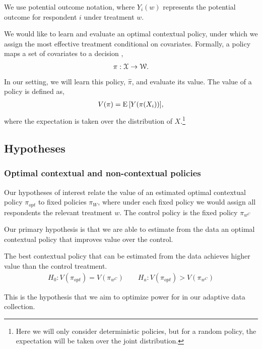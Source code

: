 \documentclass[letterpaper, 12pt, parskip=full,DIV=10]{scrartcl}
\begin{document}
We use potential outcome notation, where $Y_i(w)$ represents the potential outcome for respondent $i$ under treatment $w$.%


We would like to learn and evaluate an optimal contextual policy, under which we assign the most effective treatment conditional on covariates. Formally, a policy maps a set of covariates to a decision \citep{athey2017efficient}, %
\begin{align}
  \pi: {\EuScript X} \rightarrow {\EuScript W}. 
  \label{eq:policy}
\end{align}
In our setting, we will learn this policy, $\hat \pi$, and evaluate its value. The value of a policy is defined as, 
\begin{align}
V(\pi) =  {\textrm E}\,[Y(\pi(X_{i}))],
  \label{eq:policy_value}
\end{align}
where the expectation is taken over the distribution of $X$.\footnote{Here we will only consider deterministic policies, but for a random policy, the expectation will be taken over the joint distribution. }

\subsection{Hypotheses}\label{hypotheses}

\subsubsection{Optimal contextual and non-contextual policies}\label{policiesbest}
Our hypotheses of interest relate the value of an estimated optimal contextual policy $\pi_{opt}$ to fixed policies $\pi_{W}$, where under each fixed policy we would assign all respondents the relevant treatment $w$. The control policy is the fixed policy $\pi_{w^{C}}$

Our primary hypothesis is that we are able to estimate from the data an optimal contextual policy that improves value over the control. 
  \begin{hypothesis}
  The best contextual policy that can be estimated from the data achieves higher value than the control treatment. \label{eq:optctr}
\begin{align}
  H_{0}: V(\pi_{opt}) = V(\pi_{w^{C}}) \qquad H_{a}:  V(\pi_{opt}) > V(\pi_{w^{C}})
\end{align}
\end{hypothesis}
This is the hypothesis that we aim to optimize power for in our adaptive data collection. 
\end{document}
